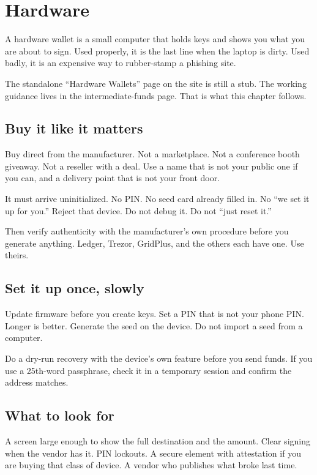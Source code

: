 \chapter{Hardware}

A hardware wallet is a small computer that holds keys
and shows you what you are about to sign. Used properly,
it is the last line when the laptop is dirty. Used
badly, it is an expensive way to rubber-stamp a phishing
site.

The standalone ``Hardware Wallets'' page on the site is
still a stub. The working guidance lives in the
intermediate-funds page. That is what this chapter
follows.

\section{Buy it like it matters}

Buy direct from the manufacturer. Not a marketplace.
Not a conference booth giveaway. Not a reseller with a
deal. Use a name that is not your public one if you can,
and a delivery point that is not your front door.

It must arrive uninitialized. No PIN. No seed card
already filled in. No ``we set it up for you.'' Reject
that device. Do not debug it. Do not ``just reset it.''

Then verify authenticity with the manufacturer's own
procedure before you generate anything. Ledger, Trezor,
GridPlus, and the others each have one. Use theirs.

\section{Set it up once, slowly}

Update firmware before you create keys. Set a PIN that
is not your phone PIN. Longer is better. Generate the
seed on the device. Do not import a seed from a
computer.

Do a dry-run recovery with the device's own feature
before you send funds. If you use a 25th-word
passphrase, check it in a temporary session and confirm
the address matches.

\section{What to look for}

A screen large enough to show the full destination and
the amount. Clear signing when the vendor has it. PIN
lockouts. A secure element with attestation if you are
buying that class of device. A vendor who publishes what
broke last time.

